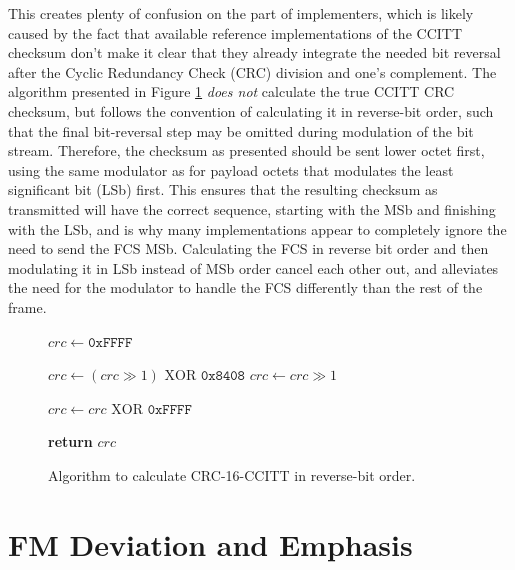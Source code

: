\documentclass[12pt,letterpaper]{article}
\begin{document}
This creates plenty of confusion on the part of implementers, 
which is likely caused by the fact that 
available reference implementations of the CCITT checksum don't
make it clear that they already integrate the needed bit reversal 
after the Cyclic Redundancy Check (CRC) division and one's complement.
The algorithm presented in Figure \ref{fig:crcccittcode} 
\emph{does not} calculate the true CCITT CRC checksum, but
follows the convention of
calculating it in reverse-bit order, such that the final bit-reversal step 
may be omitted during modulation of the bit stream.
Therefore, the checksum as presented should be sent lower octet first, 
using the same modulator as for payload octets that modulates the 
least significant bit (LSb) first.
This ensures that the resulting checksum as transmitted will have the 
correct sequence, starting with the MSb and finishing with the LSb,
and is why many implementations appear to completely ignore the
need to send the FCS MSb.
Calculating the FCS in reverse bit order and then modulating it in LSb
instead of MSb order cancel each other out, and alleviates the need for 
the modulator to handle the FCS differently than the rest of the frame.

\begin{figure}
	\begin{algorithmic}[1]
		\State $crc \gets \texttt{0xFFFF}$

			\State $crc \gets (crc \gg 1) \textrm{ XOR } \texttt{0x8408}$
		\Else
			\State $crc \gets crc \gg 1$
		\EndIf
		\EndFor
		\EndFor

		\State $crc \gets crc \textrm{ XOR } \texttt{0xFFFF}$

		\State \textbf{return} $crc$
		\EndFunction
	\end{algorithmic}
	\caption{Algorithm to calculate CRC-16-CCITT in reverse-bit order.}
	\label{fig:crcccittcode}
\end{figure}

\section{FM Deviation and Emphasis}
\end{document}
